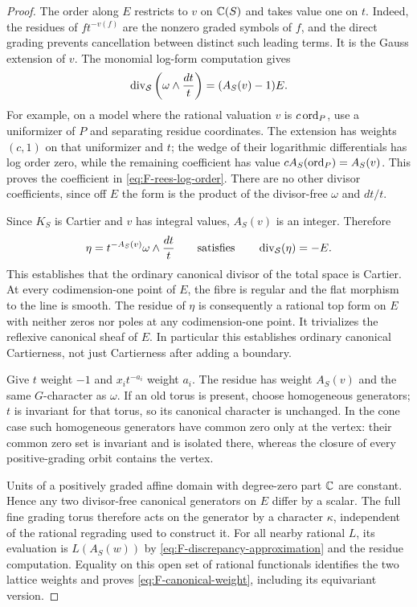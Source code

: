 \begin{proof}
The order along $E$ restricts to $v$ on $\mathbb C(S)$ and takes value
one on $t$.  Indeed, the residues of $f t^{-v(f)}$ are the
nonzero graded symbols of $f$, and the direct grading prevents
cancellation between distinct such leading terms.  It is the
Gauss extension of $v$.  The monomial log-form computation gives
\begin{equation}\label{eq:F-rees-log-order}
 \operatorname{div}_{\mathcal S}\left(\omega\wedge\frac{dt}{t}\right)
       =(A_S(v)-1)E.
\end{equation}
For example, on a model where the rational valuation $v$ is
$c\operatorname{ord}_P$, use a uniformizer of $P$ and separating residue
coordinates.  The extension has weights $(c,1)$ on that
uniformizer and $t$; the wedge of their logarithmic differentials
has log order zero, while the remaining coefficient has value
$cA_S(\operatorname{ord}_P)=A_S(v)$.  This proves the coefficient in
\eqref{eq:F-rees-log-order}.  There are no other divisor
coefficients, since off $E$ the form is the product of the
divisor-free $\omega$ and $dt/t$.

Since $K_S$ is Cartier and $v$ has integral values, $A_S(v)$ is an
integer.  Therefore
\[
 \eta=t^{-A_S(v)}\omega\wedge\frac{dt}{t}
 \qquad\text{satisfies}\qquad \operatorname{div}_{\mathcal S}(\eta)=-E.
\]
This establishes that the ordinary canonical divisor of the
total space is Cartier.  At every codimension-one point of $E$,
the fibre is regular and the flat morphism to the line is smooth.
The residue of $\eta$ is consequently a rational top form on $E$
with neither zeros nor poles at any codimension-one point.
It trivializes the reflexive canonical sheaf of $E$.
In particular this establishes ordinary canonical Cartierness,
not just Cartierness after adding a boundary.

Give $t$ weight $-1$ and $x_i t^{-a_i}$ weight $a_i$.  The residue
has weight $A_S(v)$ and the same $G$-character as $\omega$.
If an old torus is present, choose homogeneous generators;
$t$ is invariant for that torus, so its canonical character is
unchanged.  In the cone case such homogeneous generators have
common zero only at the vertex: their common zero set is
invariant and is isolated there, whereas the closure of every
positive-grading orbit contains the vertex.

Units of a positively graded affine domain with degree-zero part
$\mathbb C$ are constant.  Hence any two divisor-free canonical
generators on $E$ differ by a scalar.  The full fine grading
torus therefore acts on the generator by a character $\kappa$,
independent of the rational regrading used to construct it.
For all nearby rational $L$, its evaluation is
$L(A_S(w))$ by \eqref{eq:F-discrepancy-approximation} and the
residue computation.  Equality on this open set of rational
functionals identifies the two lattice weights and proves
\eqref{eq:F-canonical-weight}, including its equivariant version.


\end{proof}
